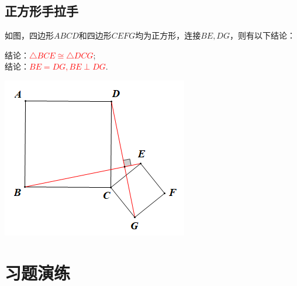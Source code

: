 \documentclass[10pt]{ctexart}
\begin{document}
\subsection{正方形手拉手}
\begin{minipage}{0.6\textwidth}
如图，四边形$ABCD$和四边形$CEFG$均为正方形，连接$BE,DG$，则有以下结论：

结论：\textcolor{red}{$\triangle BCE\cong \triangle DCG$};\\
结论：\textcolor{red}{$BE=DG,BE\perp DG$}.
\end{minipage}
\begin{minipage}{0.4\textwidth}
\includegraphics[scale=0.7]{figure/shoulashou04}
\end{minipage}

\section{习题演练}
\end{document}
